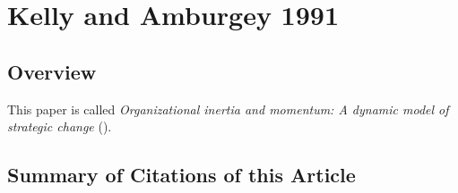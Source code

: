 \section{Kelly and Amburgey 1991}

\subsection{Overview}

This paper is called \textit{Organizational inertia and momentum: A dynamic model of strategic change} (\cite{kelly1991organizational}).\\

\subsection{Summary of Citations of this Article}


